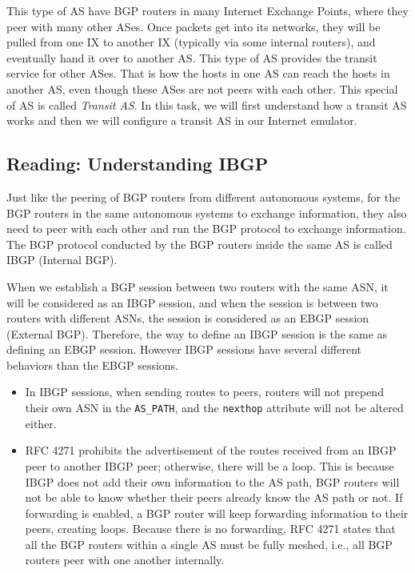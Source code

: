 This type of AS have BGP routers in many Internet
Exchange Points, where they peer with many other ASes. Once packets get into
its networks, they will be pulled from one IX to another IX (typically via
some internal routers), and eventually
hand it over to another AS. This type of AS provides the transit
service for other ASes. That is how the hosts in one AS can reach the hosts in
another AS, even though these ASes are not peers with each other.
This special of AS is called \textit{Transit AS}.
In this task, we will first understand how a transit AS works and
then we will configure a transit AS in our Internet emulator.  


\subsection{Reading: Understanding IBGP} 

Just like the peering of BGP routers from different
autonomous systems, for the BGP routers in the same
autonomous systems to exchange information, they
also need to peer with each other and run the BGP
protocol to exchange information.
The BGP protocol conducted by the BGP routers
inside the same AS is called IBGP (Internal BGP).

When we establish a BGP session between two routers with the same ASN, it will be considered
as an IBGP session, and when the session is between two routers with different ASNs, the session
is considered as an EBGP session (External BGP).
Therefore, the way to define
an IBGP session is the same as defining an EBGP session.
However IBGP sessions have several different behaviors 
than the EBGP sessions.


\begin{itemize}
\item In IBGP sessions, when sending routes to peers,
routers will not prepend their own ASN in the \texttt{AS\_PATH},
and the \texttt{nexthop} attribute will not be altered either.

\item RFC 4271 prohibits the advertisement of the routes received from 
an IBGP peer to another IBGP peer; otherwise, there will be a loop.
This is because IBGP does not add their own information
to the AS path, BGP routers will not be able to know whether
their peers already know the AS path or not. If forwarding
is enabled, a BGP router will keep forwarding information
to their peers, creating loops. 
Because there is no forwarding, 
RFC 4271 states that all the BGP routers within a single AS must be 
fully meshed, i.e., all BGP routers peer with one another internally.
\end{itemize}


